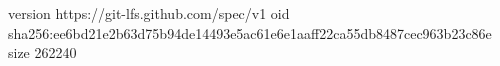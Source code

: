 version https://git-lfs.github.com/spec/v1
oid sha256:ee6bd21e2b63d75b94de14493e5ac61e6e1aaff22ca55db8487cec963b23c86e
size 262240
